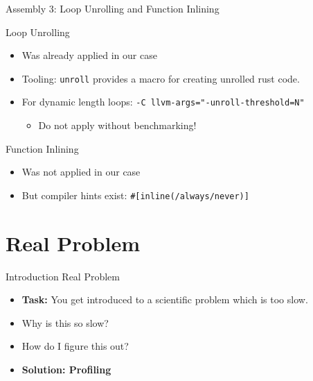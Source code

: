 \documentclass[compress,aspectratio=169]{beamer}
\begin{document}
\begin{frame}{Assembly 3: Loop Unrolling and Function Inlining}
  \begin{block}{Loop Unrolling}
    \begin{itemize}
      \item Was already applied in our case
      \item Tooling: \texttt{unroll} \cite{unroll} provides a macro for creating unrolled rust code.
      \item For dynamic length loops: \texttt{-C llvm-args="-unroll-threshold=N"}
        \begin{itemize}
          \item Do not apply without benchmarking!
        \end{itemize}
    \end{itemize}
  \end{block}
  \begin{block}{Function Inlining}
    \begin{itemize}
      \item Was not applied in our case
      \item But compiler hints exist: \texttt{\#[inline(/always/never)]} \cite{perfbook}
    \end{itemize}
  \end{block}
\end{frame}

\section{Real Problem}

\begin{frame}{Introduction Real Problem}
  \begin{itemize}
    \item \textbf{Task:} You get introduced to a scientific problem which is too slow.
      \pause
    \item Why is this so slow?
      \pause
    \item How do I figure this out?
      \pause
    \item \textbf{Solution: Profiling}
  \end{itemize}
\end{frame}
\end{document}
